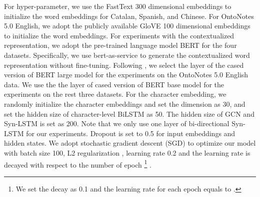 \documentclass[11pt]{article}
\begin{document}
For hyper-parameter, we use the FastText \cite{grave2018learning} 300 dimensional embeddings to initialize the word embeddings for Catalan, Spanish, and Chinese. 
For OntoNotes 5.0 English, we adopt the publicly available GloVE \cite{pennington2014glove} 100 dimensional embeddings to initialize the word embeddings.  
For experiments with the contextualized representation, we adopt the pre-trained language model BERT \cite{devlin2019bert} for the four datasets.  
Specifically, we use bert-as-service \cite{xiao2018bertservice} to generate the contextualized word representation without fine-tuning. 
Following \citet{Luo2019HierarchicalCR},
we select the  layer of the cased version of BERT large model for the experiments on the OntoNotes 5.0 English data. 
We use the  the  layer of cased version of BERT base model for the experiments on the rest three datasets.
For the character embedding, we randomly initialize the character embeddings and set the dimension as 30, and set the hidden size of character-level BiLSTM as 50. 
The hidden size of GCN and Syn-LSTM is set as 200. 
Note that we only use one layer of bi-directional Syn-LSTM for our experiments.
Dropout is set to 0.5 for input embeddings and hidden states. 
We adopt stochastic gradient descent (SGD) to optimize our model with batch size 100, L2 regularization , learning rate 0.2 and the learning rate is decayed with respect to the number of epoch \footnote{We set the decay as 0.1 and the learning rate for each epoch equals to .} . 


\begin{table}[t!]
	\centering
\caption{Performance of the trained dependency parser.}
\label{tab:dep_result}
\end{table}
\end{document}
